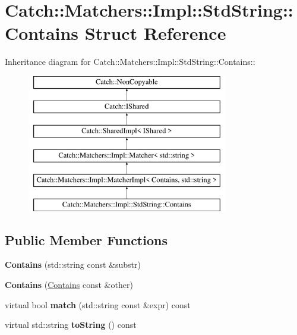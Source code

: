 \hypertarget{structCatch_1_1Matchers_1_1Impl_1_1StdString_1_1Contains}{
\section{Catch::Matchers::Impl::StdString::Contains Struct Reference}
\label{structCatch_1_1Matchers_1_1Impl_1_1StdString_1_1Contains}
}
Inheritance diagram for Catch::Matchers::Impl::StdString::Contains::\begin{figure}[H]
\begin{center}
\leavevmode
\includegraphics[height=6cm]{structCatch_1_1Matchers_1_1Impl_1_1StdString_1_1Contains}
\end{center}
\end{figure}
\subsection*{Public Member Functions}
\begin{DoxyCompactItemize}
\item 
\hypertarget{structCatch_1_1Matchers_1_1Impl_1_1StdString_1_1Contains_ac6f13133724bfd5796e8ee4ea8f2c0e3}{
{\bfseries Contains} (std::string const \&substr)}
\label{structCatch_1_1Matchers_1_1Impl_1_1StdString_1_1Contains_ac6f13133724bfd5796e8ee4ea8f2c0e3}

\item 
\hypertarget{structCatch_1_1Matchers_1_1Impl_1_1StdString_1_1Contains_ad6b1ef653dfcb3bab43c43be043dc4e8}{
{\bfseries Contains} (\hyperlink{structCatch_1_1Matchers_1_1Impl_1_1StdString_1_1Contains}{Contains} const \&other)}
\label{structCatch_1_1Matchers_1_1Impl_1_1StdString_1_1Contains_ad6b1ef653dfcb3bab43c43be043dc4e8}

\item 
\hypertarget{structCatch_1_1Matchers_1_1Impl_1_1StdString_1_1Contains_aa27d823dea5770025a24424fc3355a6f}{
virtual bool {\bfseries match} (std::string const \&expr) const }
\label{structCatch_1_1Matchers_1_1Impl_1_1StdString_1_1Contains_aa27d823dea5770025a24424fc3355a6f}

\item 
\hypertarget{structCatch_1_1Matchers_1_1Impl_1_1StdString_1_1Contains_a226755351f3598179925f3ab89d6def7}{
virtual std::string {\bfseries toString} () const }
\label{structCatch_1_1Matchers_1_1Impl_1_1StdString_1_1Contains_a226755351f3598179925f3ab89d6def7}

\end{DoxyCompactItemize}
